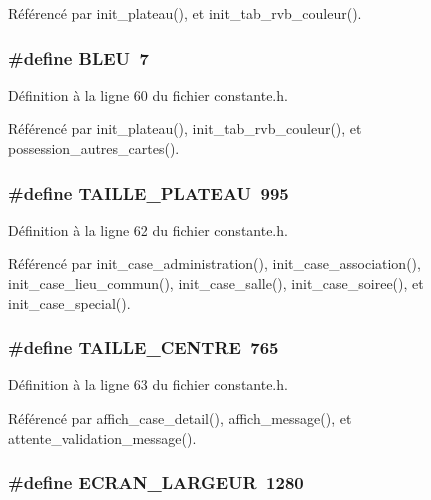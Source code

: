 R\'{e}f\'{e}renc\'{e} par init\_\-plateau(), et init\_\-tab\_\-rvb\_\-couleur().
\subsubsection{\setlength{\rightskip}{0pt plus 5cm}\#define BLEU~7}\label{constante_8h_e22837728df88da892b4bb16bb98296d}




D\'{e}finition \`{a} la ligne 60 du fichier constante.h.

R\'{e}f\'{e}renc\'{e} par init\_\-plateau(), init\_\-tab\_\-rvb\_\-couleur(), et possession\_\-autres\_\-cartes().
\subsubsection{\setlength{\rightskip}{0pt plus 5cm}\#define TAILLE\_\-PLATEAU~995}\label{constante_8h_dc3c2556e84bebbe78c8a87fc459a6f8}




D\'{e}finition \`{a} la ligne 62 du fichier constante.h.

R\'{e}f\'{e}renc\'{e} par init\_\-case\_\-administration(), init\_\-case\_\-association(), init\_\-case\_\-lieu\_\-commun(), init\_\-case\_\-salle(), init\_\-case\_\-soiree(), et init\_\-case\_\-special().
\subsubsection{\setlength{\rightskip}{0pt plus 5cm}\#define TAILLE\_\-CENTRE~765}\label{constante_8h_9dbe26bde38917ef0decafea2a27026f}




D\'{e}finition \`{a} la ligne 63 du fichier constante.h.

R\'{e}f\'{e}renc\'{e} par affich\_\-case\_\-detail(), affich\_\-message(), et attente\_\-validation\_\-message().
\subsubsection{\setlength{\rightskip}{0pt plus 5cm}\#define ECRAN\_\-LARGEUR~1280}\label{constante_8h_9d3174c3ceaaa38110359aeff7c2e025}




